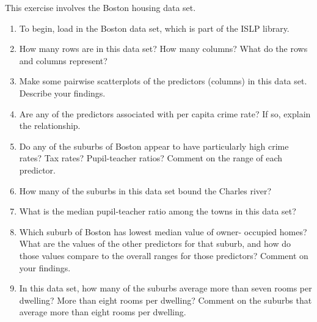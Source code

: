 	\begin{exercise}[2.10]
		This exercise involves the Boston housing data set.
		\begin{enumerate}[label=(\alph*)]
		\item To begin, load in the Boston data set, which is part of the ISLP
		library.
		\item How many rows are in this data set? How many columns? What
		do the rows and columns represent?
		\item Make some pairwise scatterplots of the predictors (columns) in
		this data set. Describe your findings.
		\item Are any of the predictors associated with per capita crime rate?
		If so, explain the relationship. 
		\item Do any of the suburbs of Boston appear to have particularly
		high crime rates? Tax rates? Pupil-teacher ratios? Comment on
		the range of each predictor.		 
		\item How many of the suburbs in this data set bound the Charles
		river?		 
		\item What is the median pupil-teacher ratio among the towns in this
		data set?		 
		\item Which suburb of Boston has lowest median value of owner-
		occupied homes? What are the values of the other predictors
		for that suburb, and how do those values compare to the overall
		ranges for those predictors? Comment on your findings.	 	 
		\item In this data set, how many of the suburbs average more than
		seven rooms per dwelling? More than eight rooms per dwelling?
		Comment on the suburbs that average more than eight rooms
		per dwelling.
		\end{enumerate}
	\end{exercise}
	
		
		
		
\newpage	
